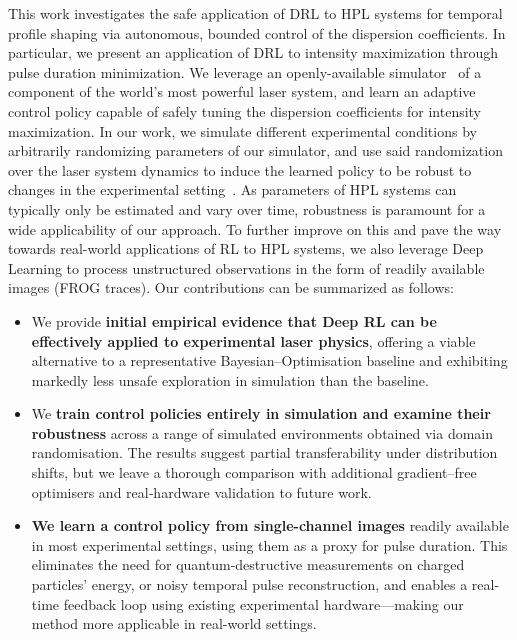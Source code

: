 This work investigates the safe application of DRL to HPL systems for temporal profile shaping via autonomous, bounded control of the dispersion coefficients. In particular, we present an application of DRL to intensity maximization through pulse duration minimization. We leverage an openly-available simulator~\citep{capuano2023temporl} of a component of the world's most powerful laser system, and learn an adaptive control policy capable of safely tuning the dispersion coefficients for intensity maximization. In our work, we simulate different experimental conditions by arbitrarily randomizing parameters of our simulator, and use said randomization over the laser system dynamics to induce the learned policy to be robust to changes in the experimental setting~\citep{tiboni2023domain}.
As parameters of HPL systems can typically only be estimated and vary over time, robustness is paramount for a wide applicability of our approach. To further improve on this and pave the way towards real-world applications of RL to HPL systems, we also leverage Deep Learning to process unstructured observations in the form of readily available images (FROG traces). Our contributions can be summarized as follows:
\begin{itemize}
\item We provide \textbf{initial empirical evidence that Deep RL can be effectively applied to experimental laser physics}, offering a viable alternative to a representative Bayesian--Optimisation baseline and exhibiting markedly less unsafe exploration in simulation than the baseline.
\item We \textbf{train control policies entirely in simulation and examine their robustness} across a range of simulated environments obtained via domain randomisation. The results suggest partial transferability under distribution shifts, but we leave a thorough comparison with additional gradient–free optimisers and real‐hardware validation to future work.
\item \textbf{We learn a control policy from single-channel images} readily available in most experimental settings, using them as a proxy for pulse duration. This eliminates the need for quantum-destructive measurements on charged particles' energy, or noisy temporal pulse reconstruction, and enables a real-time feedback loop using existing experimental hardware---making our method more applicable in real-world settings.
\end{itemize}
